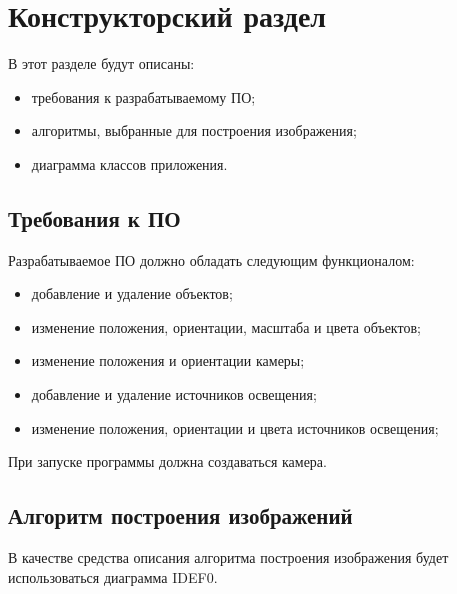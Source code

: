 \chapter{Конструкторский раздел}


В этот разделе будут описаны:
\begin{itemize}
    \item требования к разрабатываемому ПО;
    \item алгоритмы, выбранные для построения изображения;
    \item диаграмма классов приложения.
\end{itemize}

\section{Требования к ПО}

\noindent Разрабатываемое ПО должно обладать следующим функционалом:
\begin{itemize}
    \item добавление и удаление объектов;
    \item изменение положения, ориентации, масштаба и цвета объектов;
    \item изменение положения и ориентации камеры;
    \item добавление и удаление источников освещения;
    \item изменение положения, ориентации и цвета источников освещения;
\end{itemize}

При запуске программы должна создаваться камера.


\section{Алгоритм построения изображений}
В качестве средства описания алгоритма построения изображения будет использоваться диаграмма IDEF0.

